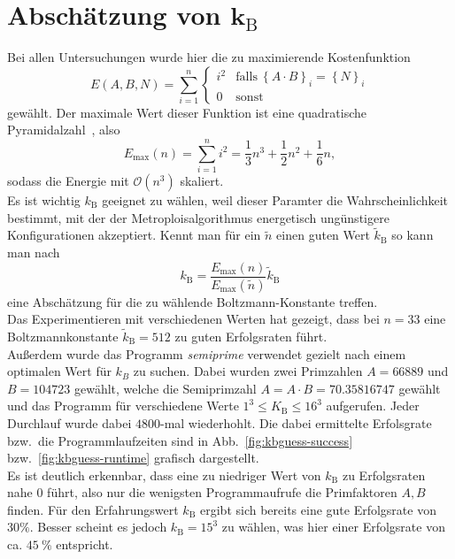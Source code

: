 \section{\texorpdfstring{Abschätzung von $\bm{k_\mathrm{B}}$}{Abschätzung von kB}}\label{sec:kbguess}
Bei allen Untersuchungen wurde hier die zu maximierende Kostenfunktion
\begin{equation*}
		E\left(A,B,N\right)=\sum\limits_{i=1}^n\begin{cases}
    i^2 & \mathrm{falls}\:{\left\{A\cdot B\right\}}_i={\left\{N\right\}}_i \\
	0 & \mathrm{sonst}
  \end{cases}
\end{equation*}
gewählt. Der maximale Wert dieser Funktion ist eine quadratische Pyramidalzahl~\parencite{oeis}, also
\begin{equation*}
		E_{\mathrm{max}}\left(n\right)=\sum\limits_{i=1}^n i^2=\frac{1}{3}n^3+\frac{1}{2}n^2+\frac{1}{6}n,
\end{equation*}
sodass die Energie mit $\mathcal{O}\left(n^3\right)$ skaliert. \\
Es ist wichtig $k_\mathrm{B}$ geeignet zu wählen, weil dieser Paramter die Wahrscheinlichkeit bestimmt, mit der der Metroploisalgorithmus energetisch ungünstigere Konfigurationen akzeptiert. Kennt man für ein $\tilde{n}$ einen guten Wert $\tilde{k}_\mathrm{B}$ so kann man nach
\begin{equation*}
		k_\mathrm{B}=\frac{E_{\mathrm{max}}\left(n\right)}{E_{\mathrm{max}}\left(\tilde{n}\right)}\tilde{k}_\mathrm{B}
\end{equation*}
eine Abschätzung für die zu wählende Boltzmann-Konstante treffen. \\
Das Experimentieren mit verschiedenen Werten hat gezeigt, dass bei $n=33$ eine Boltzmannkonstante $\tilde{k}_\mathrm{B}=512$ zu guten Erfolgsraten führt. \\
Außerdem wurde das Programm \textit{semiprime} verwendet gezielt nach einem optimalen Wert für $k_B$ zu suchen. Dabei wurden zwei Primzahlen $A=66889$ und $B=104723$ gewählt, welche die Semiprimzahl $A=A\cdot B=70.35816747$ gewählt und das Programm für verschiedene Werte $1^3\leq K_\mathrm{B}\leq 16^3$ aufgerufen. Jeder Durchlauf wurde dabei $4800$-mal wiederhohlt. Die dabei ermittelte Erfolsgrate bzw.\ die Programmlaufzeiten sind in Abb.~\ref{fig:kbguess-success} bzw.~\ref{fig:kbguess-runtime} grafisch dargestellt.\\
Es ist deutlich erkennbar, dass eine zu niedriger Wert von $k_\mathrm{B}$ zu Erfolgsraten nahe $0$ führt, also nur die wenigsten Programmaufrufe die Primfaktoren $A,B$ finden. Für den Erfahrungswert $k_\mathrm{B}$ ergibt sich bereits eine gute Erfolgsrate von $30\%$. Besser scheint es jedoch $k_\mathrm{B}=15^3$ zu wählen, was hier einer Erfolgsrate von ca. $\SI{45}{\percent}$ entspricht.
